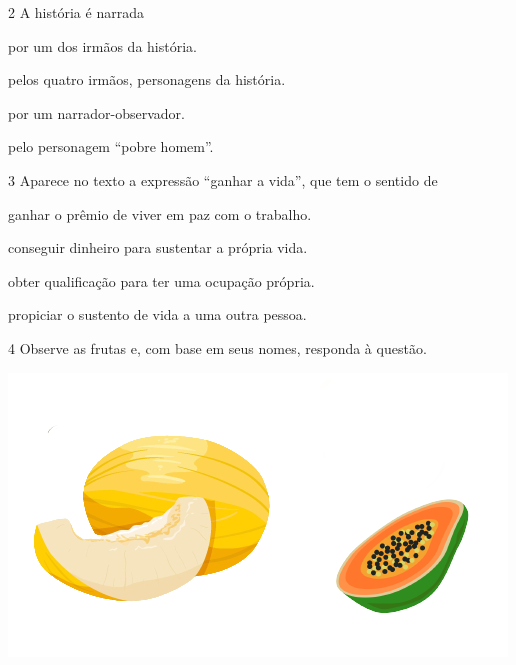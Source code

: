 \num{2} A história é narrada

\begin{escolha}
\item por um dos irmãos da história.

\item pelos quatro irmãos, personagens da história.

\item por um narrador-observador.

\item pelo personagem ``pobre homem''.
\end{escolha}

\pagebreak

\num{3} Aparece no texto a expressão ``ganhar a vida'', que tem o sentido de

\begin{escolha}
\item ganhar o prêmio de viver em paz com o trabalho.

\item conseguir dinheiro para sustentar a própria vida.

\item obter qualificação para ter uma ocupação própria.

\item propiciar o sustento de vida a uma outra pessoa.
\end{escolha}


\num{4} Observe as frutas e, com base em seus nomes, responda à questão.



\begin{center}
\includegraphics[width=\textwidth]{./media/image23z.png}
\end{center}

